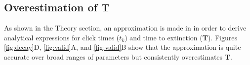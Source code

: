 \documentclass[9pt,lineno]{elife}
\begin{document}
\begin{appendixbox}



\end{appendixbox}

\begin{appendixbox}


\section{Overestimation of \textbf{T}}
\label{app:jensen}
As shown in the Theory section, an approximation is made in  in order to derive analytical expressions for click times ($t_k$) and time to extinction (\textbf{T}). 
Figures \ref{fig:decay}D, \ref{fig:valid}A, and \ref{fig:valid}B show that the approximation is quite accurate over broad ranges of parameters but consistently overestimates \textbf{T}.


\end{appendixbox}
\end{document}
